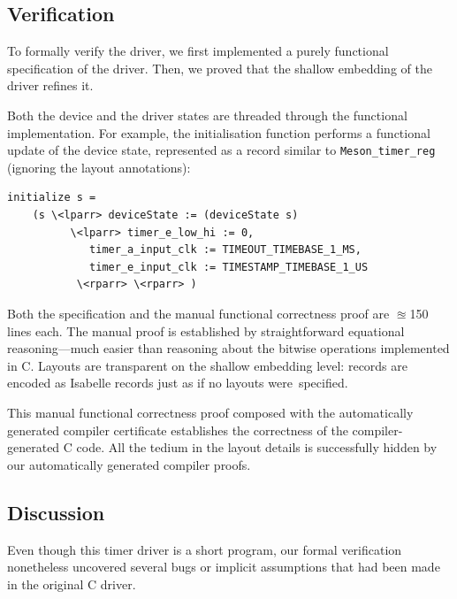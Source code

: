 \subsection{Verification}
To formally verify the driver, we first implemented a purely functional
specification of the driver. Then, we proved that the shallow embedding
of the \cogent driver refines it.

Both the device and the driver states are threaded through the functional implementation.
For example, the initialisation function performs a functional update of the device state,
represented as a record similar to
\lstinline|Meson_timer_reg| (ignoring the layout annotations):
\begin{lstlisting}[language=isa]
  initialize s =
    (s \<lparr> deviceState := (deviceState s)
          \<lparr> timer_e_low_hi := 0,
             timer_a_input_clk := TIMEOUT_TIMEBASE_1_MS,
             timer_e_input_clk := TIMESTAMP_TIMEBASE_1_US
           \<rparr> \<rparr> )
\end{lstlisting}

Both the specification and the manual functional correctness proof are $\approxeq$150 lines each.
The manual proof is established by straightforward equational reasoning---much easier than reasoning about the bitwise operations implemented in C. Layouts are transparent on the shallow embedding level: \cogent records are encoded as Isabelle records just as if no layouts were~specified.

This manual functional correctness proof composed with the automatically generated compiler certificate establishes
the correctness of the compiler-generated C code. All the tedium in the layout details is successfully hidden by our automatically generated compiler proofs.

\subsection{Discussion}
\label{ssec:issues}


Even though this timer driver is a short program, our formal verification nonetheless uncovered several bugs or implicit assumptions that had been made in the original C driver.

